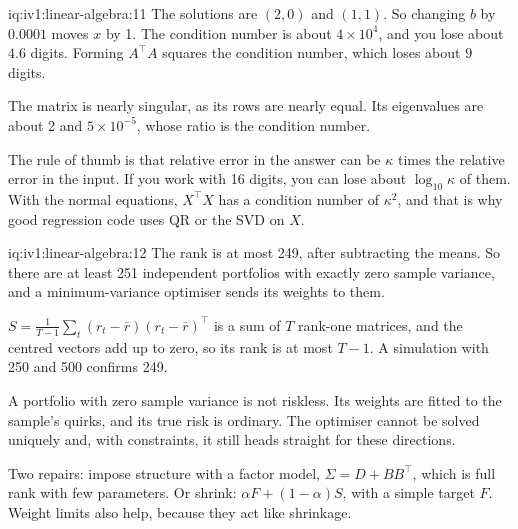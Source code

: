 \begin{solution}{iq:iv1:linear-algebra:11}
The solutions are $(2, 0)$ and $(1, 1)$. So changing $b$ by $0.0001$ moves $x$ by 1. The condition number is about $4 \times 10^4$, and you lose about $4.6$ digits. Forming $A^\top A$ squares the condition number, which loses about $9$ digits.

The matrix is nearly singular, as its rows are nearly equal. Its eigenvalues are about 2 and $5 \times 10^{-5}$, whose ratio is the condition number.

The rule of thumb is that relative error in the answer can be $\kappa$ times the relative error in the input. If you work with 16 digits, you can lose about $\log_{10}\kappa$ of them. With the normal equations, $X^\top X$ has a condition number of $\kappa^2$, and that is why good regression code uses QR or the SVD on $X$.

\end{solution}

\begin{solution}{iq:iv1:linear-algebra:12}
The rank is at most 249, after subtracting the means. So there are at least 251 independent portfolios with exactly zero sample variance, and a minimum-variance optimiser sends its weights to them.

$S = \frac{1}{T - 1}\sum_t (r_t - \bar{r})(r_t - \bar{r})^\top$ is a sum of $T$ rank-one matrices, and the centred vectors add up to zero, so its rank is at most $T - 1$. A simulation with 250 and 500 confirms 249.

A portfolio with zero sample variance is not riskless. Its weights are fitted to the sample's quirks, and its true risk is ordinary. The optimiser cannot be solved uniquely and, with constraints, it still heads straight for these directions.

Two repairs: impose structure with a factor model, $\Sigma = D + BB^\top$, which is full rank with few parameters. Or shrink: $\alpha F + (1 - \alpha)S$, with a simple target $F$. Weight limits also help, because they act like shrinkage.

\end{solution}


